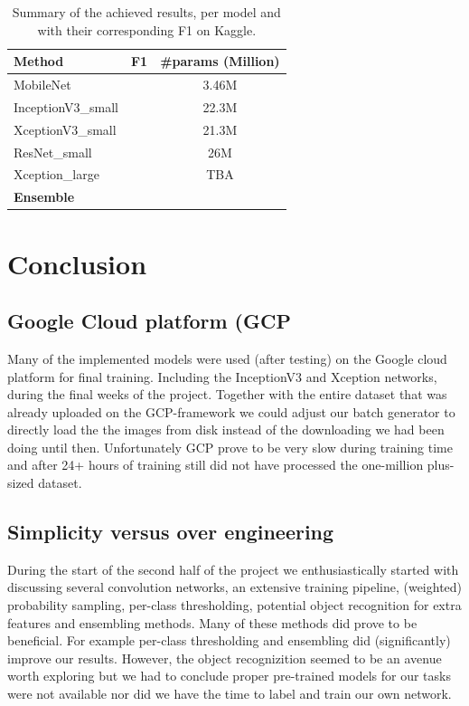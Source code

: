\documentclass[10pt, a4paper]{article}
\begin{document}
\begin{multicols}{2}
		\begin{table}[t]
			\centering
			\begin{tabular}{l|c|c}
				\toprule
				\textbf{Method} & \textbf{F1} & \textbf{\#params (Million)}\\
				\midrule
				MobileNet &  & 3.46M \\
				InceptionV3\_small &  & 22.3M\\
				XceptionV3\_small &  & 21.3M\\
				ResNet\_small &  & 26M\\
				Xception\_large &  & TBA\\
				\midrule
				\textbf{Ensemble} & & \\
				\bottomrule
			\end{tabular}
			\caption{Summary of the achieved results, per model and with their corresponding F1 on Kaggle.}
			\label{table:summary_results}
		\end{table}

		\section{Conclusion}
		\subsection{Google Cloud platform (GCP}
		Many of the implemented models were used (after testing) on the Google cloud platform for final training. Including the InceptionV3 and Xception networks, during the final weeks of the project. Together with the  entire dataset that was already uploaded on the GCP-framework we could adjust our batch generator to directly load the the images from disk instead of the downloading we had been doing until then. Unfortunately GCP prove to be very slow during training time and after 24+ hours of training still did not have processed the one-million plus-sized dataset.
		
		\subsection{Simplicity versus over engineering}
		During the start of the second half of the project we enthusiastically started with discussing several convolution networks, an extensive training pipeline, (weighted) probability sampling, per-class thresholding, potential object recognition for extra features and ensembling methods. Many of these methods did prove to be beneficial. For example per-class thresholding and ensembling did (significantly) improve our results. However, the object recognizition seemed to be an avenue worth exploring but we had to conclude proper pre-trained models for our tasks were not available nor did we have the time to label and train our own network. 
		

\end{multicols}
\end{document}
